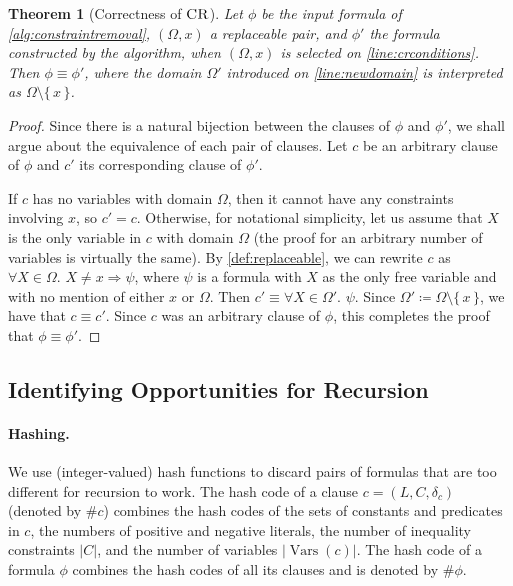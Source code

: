 \documentclass{article}
\newtheorem{theorem}{Theorem}
\theoremstyle{definition}
\DeclareMathOperator{\CR}{\textsc{CR}}
\DeclareMathOperator{\Vars}{Vars}
\begin{document}
\begin{theorem}[Correctness of $\CR$]
  Let $\phi$ be the input formula of \cref{alg:constraintremoval}, $(\Omega, x)$
  a replaceable pair, and $\phi'$ the formula constructed by the algorithm, when
  $(\Omega, x)$ is selected on \cref{line:crconditions}. Then
  $\phi \equiv \phi'$, where the domain $\Omega'$ introduced on
  \cref{line:newdomain} is interpreted as $\Omega \setminus \{\, x \,\}$.
\end{theorem}
\begin{proof}
  Since there is a natural bijection between the clauses of $\phi$ and $\phi'$,
  we shall argue about the equivalence of each pair of clauses. Let $c$ be an
  arbitrary clause of $\phi$ and $c'$ its corresponding clause of $\phi'$.

  If $c$ has no variables with domain $\Omega$, then it cannot have any
  constraints involving $x$, so $c' = c$. Otherwise, for notational simplicity,
  let us assume that $X$ is the only variable in $c$ with domain $\Omega$ (the
  proof for an arbitrary number of variables is virtually the same). By
  \cref{def:replaceable}, we can rewrite $c$ as $\forall X \in \Omega\text{.
  } X \ne x \Rightarrow \psi$, where $\psi$ is a formula with $X$ as the only free
  variable and with no mention of either $x$ or $\Omega$. Then
  $c' \equiv \forall X \in \Omega'\text{. } \psi$. Since
  $\Omega' \coloneqq \Omega \setminus \{\, x \,\}$, we have that $c \equiv c'$.
  Since $c$ was an arbitrary clause of $\phi$, this completes the proof that
  $\phi \equiv \phi'$.
\end{proof}

\subsection{Identifying Opportunities for Recursion}\label{sec:ref}

\paragraph{Hashing.}
We use (integer-valued) hash functions to discard pairs of formulas that are too
different for recursion to work. The hash code of a clause
$c = (L, C, \delta_{c})$ (denoted by $\# c$) combines the hash codes of the sets
of constants and predicates in $c$, the numbers of positive and negative
literals, the number of inequality constraints $|C|$, and the number of
variables $|\Vars(c)|$. The hash code of a formula $\phi$ combines the hash
codes of all its clauses and is denoted by $\#\phi$.
\end{document}
